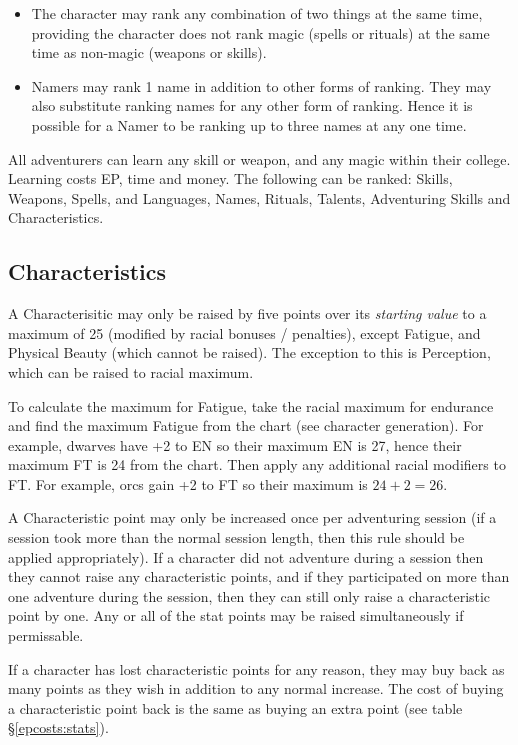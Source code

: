 \begin{multicols*}{3}
\begin{itemize}
\item
The character may rank any combination of two things at the same time,
providing the character does not rank magic (\ie spells or rituals)
at the same time as non-magic (\ie weapons or skills).

\item
Namers may rank 1 name in addition to other forms of ranking.  They
may also substitute ranking names for any other form of ranking.
Hence it is possible for a Namer to be ranking up to three names at
any one time.

\end{itemize}

All adventurers can learn any skill or weapon, and any magic within
their college. Learning costs EP, time and money.  The following can
be ranked: Skills, Weapons, Spells, and Languages, Names, Rituals,
Talents, Adventuring Skills and Characteristics.

\subsection{Characteristics}

A Characterisitic may only be raised by five points over its
\emph{starting value} to a maximum of 25 (modified by racial bonuses /
penalties), except Fatigue, and Physical Beauty (which cannot be
raised).  The exception to this is Perception, which can be raised to
racial maximum.

To calculate the maximum for Fatigue, take the racial maximum for
endurance and find the maximum Fatigue from the chart (see character
generation).  For example, dwarves have +2 to EN so their maximum EN
is 27, hence their maximum FT is 24 from the chart.  Then apply any
additional racial modifiers to FT.  For example, orcs gain +2 to FT so
their maximum is $24 + 2 = 26$.

A Characteristic point may only be increased once per adventuring
session (if a session took more than the normal session length, then
this rule should be applied appropriately).  If a character did not
adventure during a session then they cannot raise any characteristic
points, and if they participated on more than one adventure during the
session, then they can still only raise a characteristic point by one.
Any or all of the stat points may be raised simultaneously if
permissable.

If a character has lost characteristic points for any reason, they may
buy back as many points as they wish in addition to any normal
increase.  The cost of buying a characteristic point back is the same
as buying an extra point (see table \S\ref{epcosts:stats}).


\end{multicols*}
